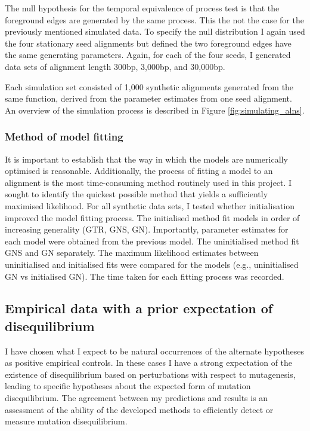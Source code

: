The null hypothesis for the temporal equivalence of process test is that the foreground edges are generated by the same process. This the not the case for the previously mentioned simulated data. To specify the null distribution I again used the four stationary seed alignments but defined the two foreground edges have the same generating parameters. Again, for each of the four seeds, I generated data sets of alignment length 300bp, 3,000bp, and 30,000bp.

Each simulation set consisted of 1,000 synthetic alignments generated from the same function, derived from the parameter estimates from one seed alignment. An overview of the simulation process is described in Figure \ref{fig:simulating_alns}.



\subsubsection{Method of model fitting}

It is important to establish that the way in which the models are numerically optimised is reasonable. Additionally, the process of fitting a model to an alignment is the most time-consuming method routinely used in this project. I sought to identify the quickest possible method that yields a sufficiently maximised likelihood. For all synthetic data sets, I tested whether initialisation improved the model fitting process. The initialised method fit models in order of increasing generality (GTR, GNS, GN). Importantly, parameter estimates for each model were obtained from the previous model. The uninitialised method fit GNS and GN separately. The maximum likelihood estimates between uninitialised and initialised fits were compared for the models (e.g., uninitialised GN vs initialised GN). The time taken for each fitting process was recorded.  

\subsection{Empirical data with a prior expectation of disequilibrium}

I have chosen what I expect to be natural occurrences of the alternate hypotheses as positive empirical controls. In these cases I have a strong expectation of the existence of disequilibrium based on perturbations with respect to mutagenesis, leading to specific hypotheses about the expected form of mutation disequilibrium. The agreement between my predictions and results is an assessment of the ability of the developed methods to efficiently detect or measure mutation disequilibrium. 

